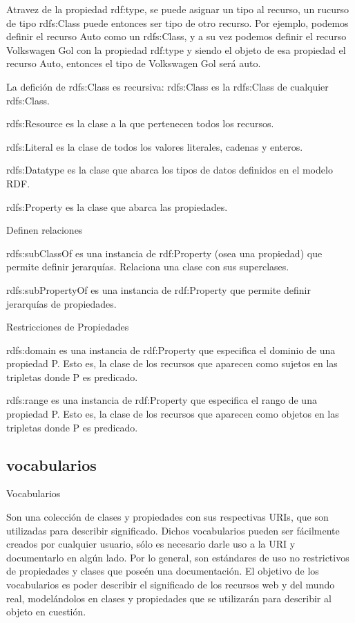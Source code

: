     Atravez de la propiedad rdf:type, se puede asignar un tipo al recurso, un rucurso de tipo rdfs:Class puede entonces ser tipo de otro recurso. 
    Por ejemplo, podemos definir el recurso Auto como un rdfs:Class, y a su vez podemos definir el recurso Volkswagen Gol con la propiedad rdf:type 
    y siendo el objeto de esa propiedad el recurso Auto, entonces el tipo de Volkswagen Gol será auto.
    
    La defición de rdfs:Class es recursiva: rdfs:Class es la rdfs:Class de cualquier rdfs:Class.

    rdfs:Resource es la clase a la que pertenecen todos los recursos.

    rdfs:Literal es la clase de todos los valores literales, cadenas y enteros.

    rdfs:Datatype es la clase que abarca los tipos de datos definidos en el modelo RDF.

    rdfs:Property es la clase que abarca las propiedades.

Definen relaciones

    rdfs:subClassOf es una instancia de rdf:Property (osea una propiedad) que permite definir jerarquías. Relaciona una clase con sus superclases.

    rdfs:subPropertyOf es una instancia de rdf:Property que permite definir jerarquías de propiedades.
    
Restricciones de Propiedades

    rdfs:domain es una instancia de rdf:Property que especifica el dominio de una propiedad P. Esto es, la clase de los recursos que aparecen como sujetos en las tripletas donde P es predicado.

    rdfs:range es una instancia de rdf:Property que especifica el rango de una propiedad P. Esto es, la clase de los recursos que aparecen como objetos en las tripletas donde P es predicado.
    
    
\subsection{vocabularios}

Vocabularios

Son una colección de clases y propiedades con sus respectivas URIs, que son utilizadas para describir significado. Dichos vocabularios 
pueden ser fácilmente creados por cualquier usuario, sólo es necesario darle uso a la URI y documentarlo en algún lado. 
Por lo general, son estándares de uso no restrictivos de propiedades y clases que poseén una documentación.
El objetivo de los vocabularios es poder describir el significado de los recursos web y del mundo real, modelándolos en clases y 
propiedades que se utilizarán para describir al objeto en cuestión.

